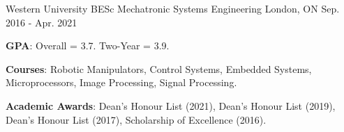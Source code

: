 

\begin{cventries}

  \cventry
    {Western University} %
    {BESc Mechatronic Systems Engineering} %
    {London, ON} %
    {Sep. 2016 - Apr. 2021} %
    {
      \begin{cvitems} %
        \item {\textbf{GPA}: Overall = 3.7. Two-Year = 3.9.}
        \item {\textbf{Courses}: Robotic Manipulators, Control Systems, Embedded Systems, Microprocessors, Image Processing, Signal Processing.}
        \item {\textbf{Academic Awards}: Dean's Honour List (2021), Dean's Honour List (2019), Dean's Honour List (2017), Scholarship of Excellence (2016).}
      \end{cvitems}
    }


\end{cventries}
